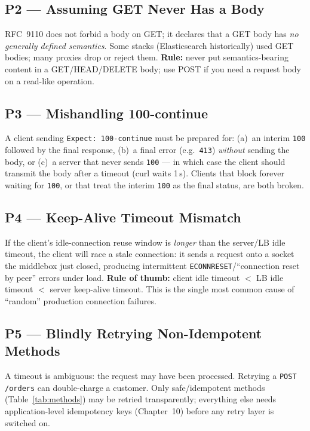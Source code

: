 \subsection*{P2 --- Assuming GET Never Has a Body}

RFC~9110 does not forbid a body on GET; it declares that a GET body has \emph{no generally defined semantics}. Some stacks (Elasticsearch historically) used GET bodies; many proxies drop or reject them. \textbf{Rule:} never put semantics-bearing content in a GET/HEAD/DELETE body; use POST if you need a request body on a read-like operation.

\subsection*{P3 --- Mishandling 100-continue}

A client sending \texttt{Expect: 100-continue} must be prepared for: (a)~an interim \texttt{100} followed by the final response, (b)~a final error (e.g.\ \texttt{413}) \emph{without} sending the body, or (c)~a server that never sends \texttt{100} --- in which case the client should transmit the body after a timeout (curl waits 1\,s). Clients that block forever waiting for \texttt{100}, or that treat the interim \texttt{100} as the final status, are both broken.

\subsection*{P4 --- Keep-Alive Timeout Mismatch}

If the client's idle-connection reuse window is \emph{longer} than the server/LB idle timeout, the client will race a stale connection: it sends a request onto a socket the middlebox just closed, producing intermittent \texttt{ECONNRESET}/``connection reset by peer'' errors under load. \textbf{Rule of thumb:} client idle timeout $<$ LB idle timeout $<$ server keep-alive timeout. This is the single most common cause of ``random'' production connection failures.

\subsection*{P5 --- Blindly Retrying Non-Idempotent Methods}

A timeout is ambiguous: the request may have been processed. Retrying a \texttt{POST /orders} can double-charge a customer. Only safe/idempotent methods (Table~\ref{tab:methods}) may be retried transparently; everything else needs application-level idempotency keys (Chapter~10) before any retry layer is switched on.

